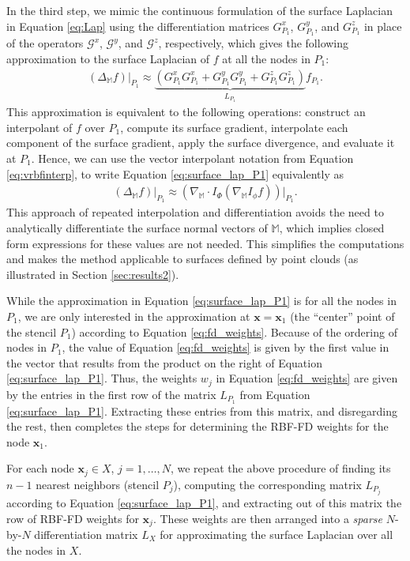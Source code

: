 \documentclass[smallextended]{svjour3}
\def\calG{{ \mathcal G}}
\newcommand{\vX}{ \mathbf{x} }
\newcommand{\lf}{\left}
\newcommand{\rt}{\right}
\begin{document}
In the third step, we mimic the continuous formulation of the surface Laplacian in Equation \eqref{eq:Lap} using the differentiation matrices $G_{P_1}^x$, $G_{P_1}^y$, and $G_{P_1}^z$ in place of the operators $\calG^x$, $\calG^y$, and $\calG^z$, respectively, which gives the following approximation to the surface Laplacian of $f$ at all the nodes in $P_1$:
\begin{align}
\lf(\Delta_{\mathbb{M}} f\rt)\bigr|_{P_1} \approx \underbrace{\lf(G_{P_1}^x G_{P_1}^x + G_{P_1}^y G_{P_1}^y + G_{P_1}^z G_{P_1}^z \rt)}_{L_{P_1}}f_{P_1}.
\label{eq:surface_lap_P1}
\end{align}
This approximation is equivalent to the following operations: construct an interpolant of $f$ over $P_1$, compute its surface gradient, interpolate each component of the surface gradient, apply the surface divergence, and evaluate it at $P_1$.  Hence, we can use the vector interpolant notation from Equation \eqref{eq:vrbfinterp}, to write Equation \eqref{eq:surface_lap_P1} equivalently as
%
\begin{align*}
\lf(\Delta_{\mathbb{M}} f\rt)\bigr|_{P_1} \approx \lf(\nabla_{\mathbb{M}}\cdot I_{\Phi} \lf(\nabla_{\mathbb{M}}I_{\phi}f\rt) \rt) \bigr|_{P_1}.
\end{align*}
%
This approach of repeated interpolation and differentiation avoids the need to analytically differentiate the surface normal vectors of $\mathbb{M}$, which implies closed form expressions for these values are not needed. This simplifies the computations and makes the method applicable to surfaces defined by point clouds (as illustrated in Section \ref{sec:results2}).

While the approximation in Equation \eqref{eq:surface_lap_P1} is for all the nodes in $P_1$,  we are only interested in the approximation at $\vX=\vX_1$ (the ``center'' point of the stencil $P_1$) according to Equation \eqref{eq:fd_weights}.  Because of the ordering of nodes in $P_1$, the value of Equation \eqref{eq:fd_weights} is given by the first value in the vector that results from the product on the right of Equation \eqref{eq:surface_lap_P1}.  Thus, the weights $w_j$ in Equation \ref{eq:fd_weights} are given by the entries in the first row of the matrix $L_{P_1}$ from Equation \eqref{eq:surface_lap_P1}.  Extracting these entries from this matrix, and disregarding the rest, then completes the steps for determining the RBF-FD weights for the node $\vX_1$.  

For each node $\vX_j\in X$, $j=1,\ldots,N$, we repeat the above procedure of finding its $n-1$ nearest neighbors (stencil $P_j$), computing the corresponding matrix $L_{P_j}$ according to Equation \eqref{eq:surface_lap_P1}, and extracting out of this matrix the row of RBF-FD weights for $\vX_j$.  These weights are then arranged into a \emph{sparse} $N$-by-$N$ differentiation matrix $L_X$ for approximating the surface Laplacian over all the nodes in $X$.  
\end{document}

